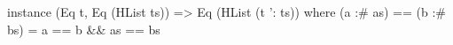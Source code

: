 \begin{code}
instance (Eq t, Eq (HList ts)) => Eq (HList (t ': ts)) where
  (a :# as) == (b :# bs) = a == b && as == bs
\end{code}
